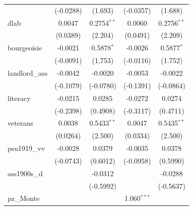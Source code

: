 \begin{table}[htbp]
\begin{tabular}{lcccc}
                                       & (-0.0288)             & (1.693)                & (-0.0357)            & (1.688)\\   
      dlab                             & 0.0047                & 0.2754$^{**}$          & 0.0060               & 0.2756$^{**}$\\   
                                       & (0.0389)              & (2.204)                & (0.0491)             & (2.209)\\   
      bourgeoisie                      & -0.0021               & 0.5878$^{*}$           & -0.0026              & 0.5877$^{*}$\\   
                                       & (-0.0091)             & (1.753)                & (-0.0116)            & (1.752)\\   
      landlord\_ass                    & -0.0042               & -0.0020                & -0.0053              & -0.0022\\   
                                       & (-0.1079)             & (-0.0780)              & (-0.1391)            & (-0.0864)\\   
      literacy                         & -0.0215               & 0.0285                 & -0.0272              & 0.0274\\   
                                       & (-0.2398)             & (0.4908)               & (-0.3117)            & (0.4711)\\   
      veterans                         & 0.0038                & 0.5433$^{**}$          & 0.0047               & 0.5435$^{**}$\\   
                                       & (0.0264)              & (2.500)                & (0.0334)             & (2.500)\\   
      psu1919\_vv                      & -0.0028               & 0.0379                 & -0.0035              & 0.0378\\   
                                       & (-0.0743)             & (0.6012)               & (-0.0958)            & (0.5990)\\   
      ass1900s\_d                      &                       & -0.0312                &                      & -0.0288\\   
                                       &                       & (-0.5992)              &                      & (-0.5637)\\   
      pz\_Monte                        &                       &                        & 1.060$^{***}$        &   \\   

\end{tabular}
\end{table}
